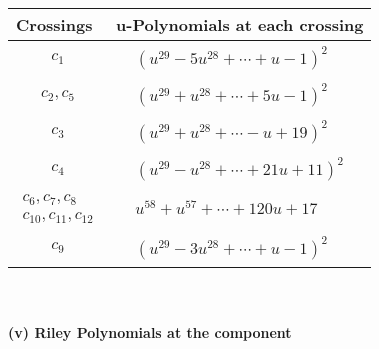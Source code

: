 \documentclass[1p]{elsarticle_modified}
\theoremstyle{definition}
\begin{document}
\begin{tabular}{m{50pt}|m{274pt}}
Crossings & \hspace{64pt}u-Polynomials at each crossing \\
\hline $$\begin{aligned}c_{1}\end{aligned}$$&$\begin{aligned}
&(u^{29}-5 u^{28}+\cdots+u-1)^{2}
\end{aligned}$\\
\hline $$\begin{aligned}c_{2},c_{5}\end{aligned}$$&$\begin{aligned}
&(u^{29}+u^{28}+\cdots+5 u-1)^{2}
\end{aligned}$\\
\hline $$\begin{aligned}c_{3}\end{aligned}$$&$\begin{aligned}
&(u^{29}+u^{28}+\cdots- u+19)^{2}
\end{aligned}$\\
\hline $$\begin{aligned}c_{4}\end{aligned}$$&$\begin{aligned}
&(u^{29}- u^{28}+\cdots+21 u+11)^{2}
\end{aligned}$\\
\hline $$\begin{aligned}c_{6},c_{7},c_{8}\\c_{10},c_{11},c_{12}\end{aligned}$$&$\begin{aligned}
&u^{58}+u^{57}+\cdots+120 u+17
\end{aligned}$\\
\hline $$\begin{aligned}c_{9}\end{aligned}$$&$\begin{aligned}
&(u^{29}-3 u^{28}+\cdots+u-1)^{2}
\end{aligned}$\\
\hline
\end{tabular}\\~\\
\newpage\renewcommand{\arraystretch}{1}
\flushleft \textbf{(v) Riley Polynomials at the component}\newline \\
\end{document}

